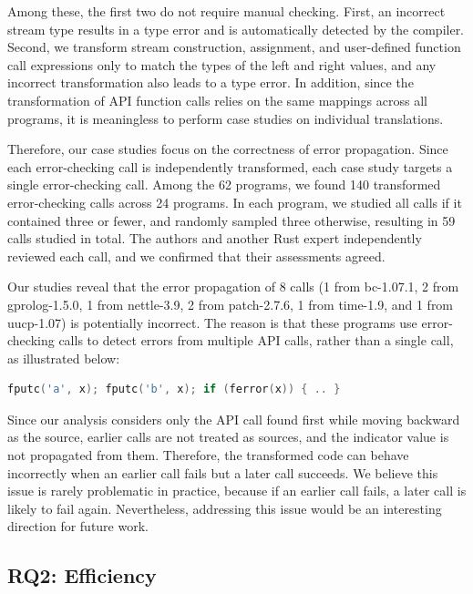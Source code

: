 Among these, the first two do not require manual checking.
%
First, an incorrect stream type results in a type error and is automatically
detected by the compiler.
%
Second, we transform stream construction, assignment, and user-defined function
call expressions only to match the types of the left and right values, and any
incorrect transformation also leads to a type error.
%
In addition, since the transformation of API function calls relies on the same
mappings across all programs, it is meaningless to perform case studies on
individual translations.

Therefore, our case studies focus on the correctness of error propagation.
%
Since each error-checking call is independently transformed, each case study
targets a single error-checking call.
%
Among the 62 programs, we found 140 transformed error-checking calls across 24
programs.
%
In each program, we studied all calls if it contained three or fewer, and
randomly sampled three otherwise, resulting in 59 calls studied in total.
%
The authors and another Rust expert independently reviewed each call, and we
confirmed that their assessments agreed.

Our studies reveal that the error propagation of 8 calls (1 from bc-1.07.1, 2
from gprolog-1.5.0, 1 from nettle-3.9, 2 from patch-2.7.6, 1 from time-1.9, and
1 from uucp-1.07) is potentially incorrect.
%
The reason is that these programs use error-checking calls to detect errors from
multiple API calls, rather than a single call, as illustrated below:

\begin{lstlisting}[language=C]
fputc('a', x); fputc('b', x); if (ferror(x)) { .. }
\end{lstlisting}

\noindent
%
Since our analysis considers only the API call found first while moving backward
as the source, earlier calls are not treated as sources, and the indicator value
is not propagated from them.
%
Therefore, the transformed code can behave incorrectly when an earlier call
fails but a later call succeeds.
%
We believe this issue is rarely problematic in practice, because if an earlier
call fails, a later call is likely to fail again.
%
Nevertheless, addressing this issue would be an interesting direction for future
work.

\subsection{RQ2: Efficiency}
\label{sec:evaluation:efficiency}

